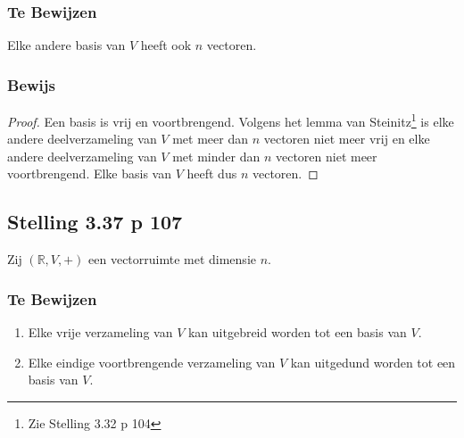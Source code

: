 \documentclass[lineaire_algebra_oplossingen.tex]{subfiles}
\begin{document}
\subsubsection*{Te Bewijzen}
Elke andere basis van $V$ heeft ook $n$ vectoren.
\subsubsection*{Bewijs}
\begin{proof}
Een basis is vrij en voortbrengend.
Volgens het lemma van Steinitz\footnote{Zie Stelling 3.32 p 104} is elke andere deelverzameling van $V$ met meer dan $n$ vectoren niet meer vrij en elke andere deelverzameling van $V$ met minder dan $n$ vectoren niet meer voortbrengend. Elke basis van $V$ heeft dus $n$ vectoren.
\end{proof}

\subsection{Stelling 3.37 p 107}
Zij $(\mathbb{R},V,+)$ een vectorruimte met dimensie $n$.
\subsubsection*{Te Bewijzen}
\begin{enumerate}
\item Elke vrije verzameling van $V$ kan uitgebreid worden tot een basis van $V$.
\item Elke eindige voortbrengende verzameling van $V$ kan uitgedund worden tot een basis van $V$.
\end{enumerate}
\end{document}
